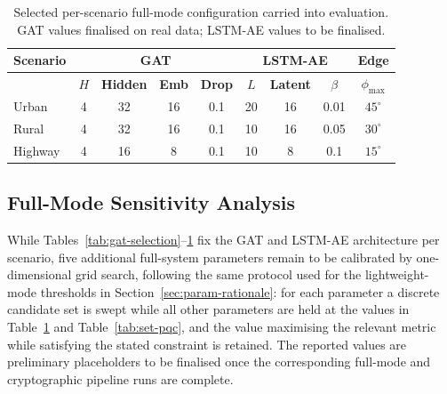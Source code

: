\documentclass[12pt, a4paper]{report}
\begin{document}
\begin{table}[H]
\centering
\caption{Selected per-scenario full-mode configuration carried into evaluation.
GAT values finalised on real data; LSTM-AE values to be finalised.}
\label{tab:fullmode-selected}
\renewcommand{\arraystretch}{1.2}
\begin{tabular}{|l|c|c|c|c|c|c|c|c|}
\hline
\textbf{Scenario} & \multicolumn{4}{c|}{\textbf{GAT}} & \multicolumn{3}{c|}{\textbf{LSTM-AE}} &
\textbf{Edge} \\
\hline
 & \textbf{$H$} & \textbf{Hidden} & \textbf{Emb} &
\textbf{Drop} & \textbf{$L$} & \textbf{Latent} & \textbf{$\beta$} &
\textbf{$\phi_{\max}$} \\
\hline
Urban    & 4 & 32 & 16 & 0.1  & 20 & 16 & 0.01 & $45^\circ$ \\
\hline
Rural    & 4 & 32 & 16 & 0.1  & 10 & 16 & 0.05 & $30^\circ$ \\
\hline
Highway  & 4 & 16 &  8 & 0.1  & 10 &  8 & 0.1 & $15^\circ$ \\
\hline
\end{tabular}
\end{table}


\subsection{Full-Mode Sensitivity Analysis}
\label{sec:fullmode-sensitivity}

While Tables~\ref{tab:gat-selection}--\ref{tab:fullmode-selected}
fix the GAT and LSTM-AE architecture per scenario, five
additional full-system parameters remain to be calibrated by
one-dimensional grid search, following the same protocol used for
the lightweight-mode thresholds in
Section~\ref{sec:param-rationale}: for each parameter a discrete
candidate set is swept while all other parameters are held at the
values in Table~\ref{tab:fullmode-selected} and
Table~\ref{tab:set-pqc}, and the value maximising the relevant
metric while satisfying the stated constraint is retained. The
reported values are preliminary placeholders to be finalised once
the corresponding full-mode and cryptographic pipeline runs are
complete.
\end{document}
